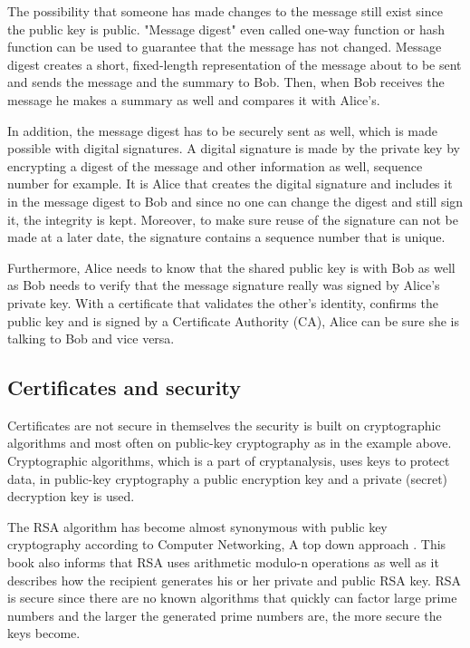 The possibility that someone has made changes to the message still exist since the public key is public. 
"Message digest" even called one-way function or hash function can be used to guarantee that the message has not changed. 
Message digest creates a short, fixed-length representation of the message about to be sent and sends the message and
the summary to Bob.
Then, when Bob receives the message he makes a summary as well and compares it with Alice's.

In addition, the message digest has to be securely sent as well, which is made possible with digital signatures. A digital signature
is made by the private key by encrypting a digest of the message and other information as well, sequence number for example.
It is Alice that creates the digital signature and includes it in the message digest to Bob and since no one can change the digest and still 
sign it, the integrity is kept. Moreover, to make sure reuse of the signature can not be made at a later date, the signature contains a 
sequence number that is unique. 

Furthermore, Alice needs to know that the shared public key is with Bob as well as Bob needs to verify that the message signature 
really was signed by Alice's private key. With a certificate that validates the other's identity, confirms the public key and
is signed by a Certificate Authority (CA), Alice can be sure she is talking to Bob and vice versa.

\subsection{Certificates and security}
Certificates are not secure in themselves the security is built on cryptographic algorithms and most often on public-key cryptography as in the example above.
Cryptographic algorithms, which is a part of cryptanalysis, uses keys to protect data, in public-key cryptography a public encryption key and a private (secret) decryption key is used. \cite[p.~252]{book:computer-security}

The RSA algorithm has become almost synonymous with public key cryptography according to Computer Networking, A top down approach \cite[p.~726]{book:computer-networking}.
This book also informs that RSA uses arithmetic modulo-n operations as well as it describes how the recipient generates his or her private and public RSA key.
RSA is secure since there are no known algorithms that quickly can factor large prime numbers and the larger the generated prime numbers are, the more secure the keys become.

